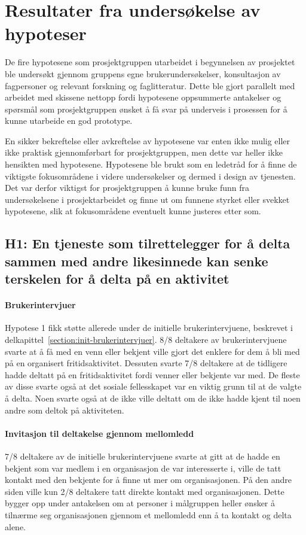 \section{Resultater fra undersøkelse av hypoteser}
De fire hypotesene som prosjektgruppen utarbeidet i begynnelsen av prosjektet ble undersøkt gjennom gruppens egne brukerundersøkelser, konsultasjon av fagpersoner og relevant forskning og faglitteratur. Dette ble gjort parallelt med arbeidet med skissene nettopp fordi hypotesene oppsummerte antakelser og spørsmål som prosjektgruppen ønsket å få svar på underveis i prosessen for å kunne utarbeide en god prototype.

En sikker bekreftelse eller avkreftelse av hypotesene var enten ikke mulig eller ikke praktisk gjennomførbart for prosjektgruppen, men dette var heller ikke hensikten med hypotesene. Hypotesene ble brukt som en ledetråd for å finne de viktigste fokusområdene i videre undersøkelser og dermed i design av tjenesten. Det var derfor viktigst for prosjektgruppen å kunne bruke funn fra undersøkelsene i prosjektarbeidet og finne ut om funnene styrket eller svekket hypotesene, slik at fokusområdene eventuelt kunne justeres etter som.

\subsection{H1: En tjeneste som tilrettelegger for å delta sammen med andre likesinnede kan senke terskelen for å delta på en aktivitet}

\paragraph{Brukerintervjuer}
Hypotese 1 fikk støtte allerede under de initielle brukerintervjuene, beskrevet i delkapittel~\ref{section:init-brukerintervjuer}. 8/8 deltakere av brukerintervjuene svarte at å få med en venn eller bekjent ville gjort det enklere for dem å bli med på en organisert fritidsaktivitet. Dessuten svarte 7/8 deltakere at de tidligere hadde deltatt på en fritidsaktivitet fordi venner eller bekjente var med. De fleste av disse svarte også at det sosiale fellesskapet var en viktig grunn til at de valgte å delta. Noen svarte også at de ikke ville deltatt om de ikke hadde kjent til noen andre som deltok på aktiviteten.

\paragraph{Invitasjon til deltakelse gjennom mellomledd}
7/8 deltakere av de initielle brukerintervjuene svarte at gitt at de hadde en bekjent som var medlem i en organisasjon de var interesserte i, ville de tatt kontakt med den bekjente for å finne ut mer om organisasjonen. På den andre siden ville kun 2/8 deltakere tatt direkte kontakt med organisasjonen. Dette bygger opp under antakelsen om at personer i målgruppen heller ønsker å tilnærme seg organisasjonen gjennom et mellomledd enn å ta kontakt og delta alene. 

